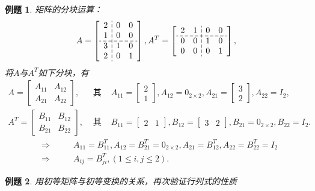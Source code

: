 \documentclass[a4paper]{book}
\newtheorem{eg}{例题}[chapter]
\begin{document}
\begin{eg}
矩阵的分块运算：
\[
  \setlength{\dashlinegap}{2pt}
  A = \left[ \begin{array}{c:cc}
    2 & 0 & 0 \\
    1 & 0 & 0 \\
    \hdashline
    3 & 1 & 0 \\
    2 & 0 & 1
  \end{array} \right],
  A^T = \left[ \begin{array}{cc:cc}
    2 & 1 & 0 & 0 \\
    \hdashline
    0 & 0 & 1 & 0 \\
    0 & 0 & 0 & 1
  \end{array} \right],
\]
将$A$与$A^T$如下分块，有
\begin{eqnarray*}
A = \begin{bmatrix}
A_{11} & A_{12} \\ A_{21} & A_{22}
\end{bmatrix},
& \text{ 其中 } &
A_{11} = \begin{bmatrix} 2 \\ 1 \end{bmatrix}, A_{12} = 0_{2\times 2}, A_{21} = \begin{bmatrix} 3 \\ 2 \end{bmatrix}, A_{22} = I_2, \\
A^T = \begin{bmatrix}
B_{11} & B_{12} \\ B_{21} & B_{22}
\end{bmatrix},
& \text{ 其中 } &
B_{11} = \begin{bmatrix} 2 & 1 \end{bmatrix}, B_{12} = \begin{bmatrix} 3 & 2 \end{bmatrix}, B_{21} = 0_{2\times 2}, B_{22} = I_2.
\end{eqnarray*}
\begin{eqnarray*}
& \Longrightarrow & \qquad A_{11} = B_{11}^T, A_{12} = B_{21}^T = 0_{2\times 2}, A_{21} = B_{12}^T, A_{22} = B_{22}^T = I_2 \\
& \Longrightarrow & \qquad A_{ij} = B_{ji}^T, (1 \leqslant i,j \leqslant 2).
\end{eqnarray*}
\end{eg}

\begin{eg}
用初等矩阵与初等变换的关系，再次验证行列式的性质
\end{eg}
\end{document}
